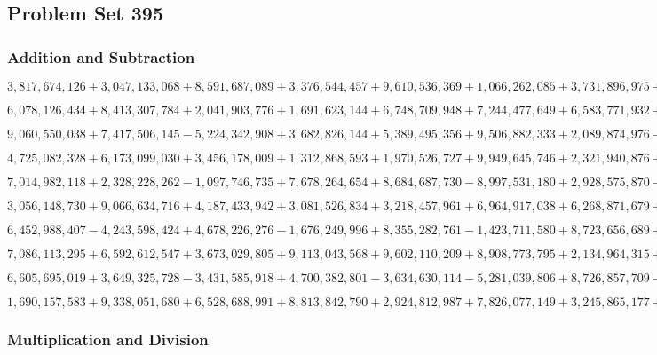 \hypertarget{problem-set-395}{%
\subsection{Problem Set 395}\label{problem-set-395}}

\hypertarget{addition-and-subtraction}{%
\subsubsection{Addition and
Subtraction}\label{addition-and-subtraction}}

\(3,817,674,126+3,047,133,068+8,591,687,089+3,376,544,457+9,610,536,369+1,066,262,085+3,731,896,975+3,501,644,605+4,280,503,730+8,486,529,864\)

\(6,078,126,434+8,413,307,784+2,041,903,776+1,691,623,144+6,748,709,948+7,244,477,649+6,583,771,932+1,445,267,261+5,900,343,157+9,737,962,734\)

\(9,060,550,038+7,417,506,145-5,224,342,908+3,682,826,144+5,389,495,356+9,506,882,333+2,089,874,976-9,839,027,449-6,057,427,573-1,864,358,553\)

\(4,725,082,328+6,173,099,030+3,456,178,009+1,312,868,593+1,970,526,727+9,949,645,746+2,321,940,876+9,569,134,721+1,356,005,503+7,786,114,362\)

\(7,014,982,118+2,328,228,262-1,097,746,735+7,678,264,654+8,684,687,730-8,997,531,180+2,928,575,870-4,491,137,318-5,586,707,699+3,319,953,300\)

\(3,056,148,730+9,066,634,716+4,187,433,942+3,081,526,834+3,218,457,961+6,964,917,038+6,268,871,679+1,631,680,959+9,839,863,256+3,091,455,443\)

\(6,452,988,407-4,243,598,424+4,678,226,276-1,676,249,996+8,355,282,761-1,423,711,580+8,723,656,689+1,864,220,577-2,333,922,037+3,304,740,707\)

\(7,086,113,295+6,592,612,547+3,673,029,805+9,113,043,568+9,602,110,209+8,908,773,795+2,134,964,315+7,336,332,980+6,027,442,138+9,540,433,274\)

\(6,605,695,019+3,649,325,728-3,431,585,918+4,700,382,801-3,634,630,114-5,281,039,806+8,726,857,709-3,094,374,454+1,950,379,963+9,864,913,668\)

\(1,690,157,583+9,338,051,680+6,528,688,991+8,813,842,790+2,924,812,987+7,826,077,149+3,245,865,177+6,546,102,101+2,001,374,823+9,504,595,347\)

\hypertarget{multiplication-and-division}{%
\subsubsection{Multiplication and
Division}\label{multiplication-and-division}}

